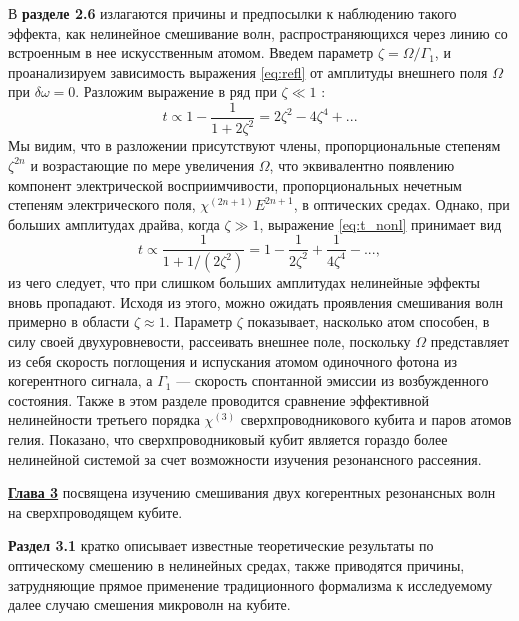 %

В \textbf{разделе 2.6} излагаются причины и предпосылки к наблюдению такого эффекта, как нелинейное смешивание волн, распространяющихся через линию со встроенным в нее искусственным атомом. Введем параметр $\zeta=\Omega/\Gamma_1$, и проанализируем зависимость выражения \eqref{eq:refl} от амплитуды внешнего поля $\Omega$ при $\delta\omega=0$.  Разложим выражение в ряд при $\zeta\ll1$ :
\begin{equation}
t \propto 1-\frac{1}{1+2\zeta^2} = 2\zeta^2 - 4\zeta^4 + ...
\label{eq:t_nonl}
\end{equation}
Мы видим, что в разложении присутствуют члены, пропорциональные степеням $\zeta^{2n}$ и возрастающие по мере увеличения $\Omega$, что эквивалентно появлению компонент электрической восприимчивости, пропорциональных нечетным степеням электрического поля, $\chi^{(2n+1)}E^{2n+1}$, в оптических средах. Однако, при больших амплитудах драйва, когда $\zeta\gg1$, выражение \eqref{eq:t_nonl}  принимает вид
\begin{equation}
t \propto \frac{1}{1+1/(2\zeta^{2})} = 1 - \frac{1}{2\zeta^2} + \frac{1}{4\zeta^4} - ... ,
\end{equation}
из чего следует, что при слишком больших амплитудах нелинейные эффекты вновь пропадают. Исходя из этого, можно ожидать проявления смешивания волн примерно в области $\zeta\approx1$.  Параметр $\zeta$ показывает, насколько атом способен, в силу своей двухуровневости, рассеивать внешнее поле, поскольку $\Omega$ представляет из себя скорость поглощения и испускания атомом одиночного фотона из когерентного сигнала, а $\Gamma_1$ --- скорость спонтанной эмиссии из возбужденного состояния. Также в этом разделе проводится сравнение эффективной нелинейности третьего порядка $\chi^{(3)}$ сверхпроводникового кубита и паров атомов гелия. Показано, что сверхпроводниковый кубит является гораздо более нелинейной системой за счет возможности изучения резонансного рассеяния. 

\underline{\textbf{Глава 3}} посвящена изучению смешивания двух когерентных резонансных волн на сверхпроводящем кубите. 

\textbf{Раздел 3.1} кратко описывает известные теоретические результаты по оптическому смешению в нелинейных средах, также приводятся причины, затрудняющие прямое применение традиционного формализма к исследуемому далее случаю смешения микроволн на кубите.


